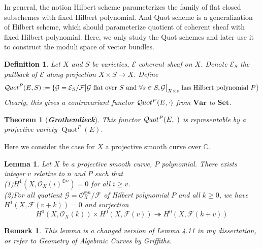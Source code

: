 \documentclass{ctexart}
\newtheorem{definition}{Definition}[section]
\newtheorem{remark}{Remark}[section]
\newtheorem{theorem}{Theorem}[section]
\newtheorem{lemma}{Lemma}[section]
\newcommand{\quotscheme}{\operatorname{Quot}}
\newcommand{\quotfunctor}{\mathcal{Q}\kern -.5pt uot}
\newcommand{\sets}{\mathbf{Set}}
\newcommand{\variety}{\mathbf{Var}}
\begin{document}
In general, the notion Hilbert scheme parameterizes the family of flat closed subschemes with fixed Hilbert polynomial.
And Quot scheme is a generalization of Hilbert scheme, which should parameterize quotient of coherent sheaf with fixed Hilbert polynomial.
Here, we only study the Quot schemes and later use it to construct the moduli space of vector bundles.
\begin{definition}
    Let $X$ and $S$ be varieties, $\mathcal{E}$ coherent sheaf on $X$.
    Denote $\mathcal{E}_{S}$ the pullback of $\mathcal{E}$ along projection $X \times S \rightarrow X$.
    Define
    \begin{equation*}
        \quotfunctor^{P}(E, S) := \{\mathcal{G} = \mathcal{E}_{S}/\mathcal{F} \big{|} \mathcal{G} \text{ flat over } S \text{ and } \forall s\in S, \mathcal{G}\big{|}_{X \times s} \text{ has Hilbert polynomial } P\}
    \end{equation*}
    Clearly, this gives a contravariant functor $\quotfunctor^{P}(E, \cdot)$ from $\variety$ to $\sets$.
\end{definition}
\begin{theorem}[\textbf{\emph{Grothendieck}}]
    This functor $\quotfunctor^{P}(E, \cdot)$ is representable by a projective variety $\quotscheme^{P}(E)$.
    \label{Theorem 7.4}
\end{theorem}
Here we consider the case for $X$ a projective smooth curve over $\mathbb{C}$.
\begin{lemma}
    Let $X$ be a projective smooth curve, $P$ polynomial.
    There exists integer $v$ relative to $n$ and $P$ such that \\
    (1)$H^{1}(X, \mathcal{O}_{X}(i)^{\oplus n}) = 0$ for all $i \ge v$. \\
    (2)For all quotient $\mathcal{G} = \mathcal{O}_{X}^{\oplus n}/\mathcal{F}$ of Hilbert polynomial $P$ and all $k \ge 0$,
    we have $H^{1}(X, \mathcal{F}(v + k)) = 0$ and surjection
    \begin{equation}
        H^{0}(X, \mathcal{O}_{X}(k)) \times H^{0}(X, \mathcal{F}(v)) \twoheadrightarrow H^{0}(X, \mathcal{F}(k + v))
    \end{equation}
    \vspace{-\baselineskip} %
    \label{Lemma 7.8}
\end{lemma}
\begin{remark}
    This lemma is a changed version of Lemma 4.11 in my dissertation, or refer to \emph{Geometry of Algebraic Curves} by Griffiths.
\end{remark}
\end{document}
